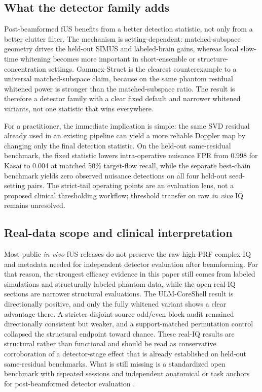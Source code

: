 \documentclass[11pt]{article}
\begin{document}
\subsection*{What the detector family adds}
Post-beamformed fUS benefits from a better detection statistic, not only from a better clutter filter. The mechanism is setting-dependent: matched-subspace geometry drives the held-out SIMUS and labeled-brain gains, whereas local slow-time whitening becomes more important in short-ensemble or structure-concentration settings. Gammex-Struct is the clearest counterexample to a universal matched-subspace claim, because on the same phantom residual whitened power is stronger than the matched-subspace ratio. The result is therefore a detector family with a clear fixed default and narrower whitened variants, not one statistic that wins everywhere.

For a practitioner, the immediate implication is simple: the same SVD residual already used in an existing pipeline can yield a more reliable Doppler map by changing only the final detection statistic. On the held-out same-residual benchmark, the fixed statistic lowers intra-operative nuisance FPR from 0.998 for Kasai to 0.004 at matched 50\% target-flow recall, while the separate best-chain benchmark yields zero observed nuisance detections on all four held-out seed-setting pairs. The strict-tail operating points are an evaluation lens, not a proposed clinical thresholding workflow; threshold transfer on raw \emph{in vivo} IQ remains unresolved.

\subsection*{Real-data scope and clinical interpretation}
Most public \emph{in vivo} fUS releases do not preserve the raw high-PRF complex IQ and metadata needed for independent detector evaluation after beamforming. For that reason, the strongest efficacy evidence in this paper still comes from labeled simulations and structurally labeled phantom data, while the open real-IQ sections are narrower structural evaluations. The ULM-CoreShell result is directionally positive, and only the fully whitened variant shows a clear advantage there. A stricter disjoint-source odd/even block audit remained directionally consistent but weaker, and a support-matched permutation control collapsed the structural endpoint toward chance. These real-IQ results are structural rather than functional and should be read as conservative corroboration of a detector-stage effect that is already established on held-out same-residual benchmarks. What is still missing is a standardized open benchmark with repeated sessions and independent anatomical or task anchors for post-beamformed detector evaluation \cite{LambertNeuropixels2025,COMBOWindow2024,ChenComa2025,Rabut2024,MobileFUS2025}.
\end{document}
